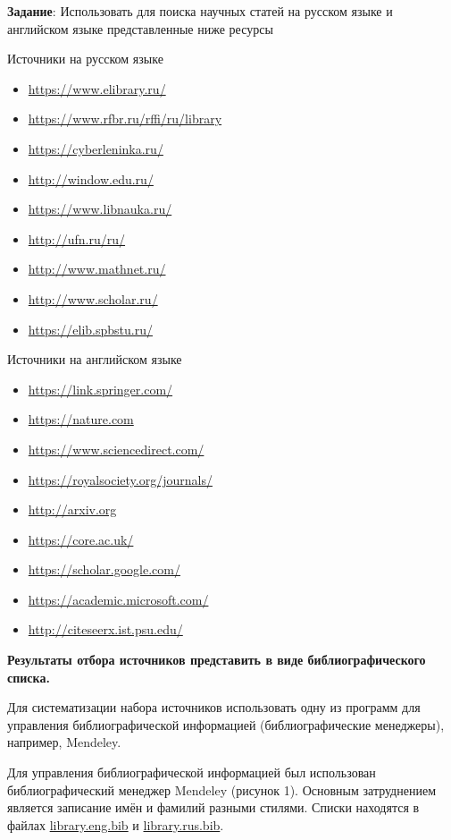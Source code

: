 \documentclass[a4paper, 12pt]{report}		%
\begin{document}
\textbf{Задание}: Использовать для поиска научных статей на русском языке и английском языке представленные ниже ресурсы


Источники на русском языке
\begin{itemize}
\item \url{https://www.elibrary.ru/}
\item \url{https://www.rfbr.ru/rffi/ru/library}
\item \url{https://cyberleninka.ru/}
\item \url{http://window.edu.ru/}
\item \url{https://www.libnauka.ru/}
\item \url{http://ufn.ru/ru/}
\item \url{http://www.mathnet.ru/}
\item \url{http://www.scholar.ru/}
\item \url{https://elib.spbstu.ru/}
\end{itemize}

Источники на английском языке
\begin{itemize}
\item \url{https://link.springer.com/}
\item \url{https://nature.com}
\item \url{https://www.sciencedirect.com/}
\item \url{https://royalsociety.org/journals/}
\item \url{http://arxiv.org}
\item \url{https://core.ac.uk/}
\item \url{https://scholar.google.com/}
\item \url{https://academic.microsoft.com/}
\item \url{http://citeseerx.ist.psu.edu/}
\end{itemize}

\textbf{Результаты отбора источников представить в виде библиографического списка.}

Для систематизации набора источников использовать одну из программ для управления библиографической информацией (библиографические менеджеры), например, Mendeley.


Для управления библиографической информацией был использован библиографический менеджер Mendeley (рисунок 1). Основным затруднением является записание имён и фамилий разными стилями. Списки находятся в файлах \href{https://raw.githubusercontent.com/SemenMartynov/SPbPU_DigitalResources/main/Practice2/res/library.eng.bib}{library.eng.bib} и \href{https://raw.githubusercontent.com/SemenMartynov/SPbPU_DigitalResources/main/Practice2/res/library.rus.bib}{library.rus.bib}.
\end{document}
